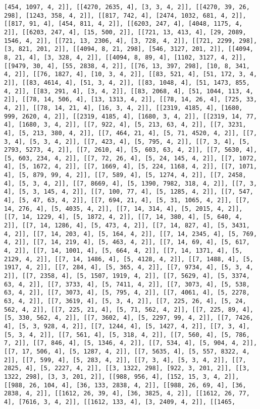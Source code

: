 \documentclass[12pt,fleqn]{article}\usepackage{../../common}
\begin{document}
\begin{verbatim}
[454, 1097, 4, 2]], [[4270, 2635, 4], [3, 3, 4, 2]], [[4270, 39, 26, 298], [1243, 358, 4, 2]], [[817, 742, 4], [2474, 1032, 681, 4, 2]], [[817, 91, 4], [454, 811, 4, 2]], [[6203, 247, 4], [4048, 1175, 4, 2]], [[6203, 247, 4], [15, 500, 2]], [[721, 13, 413, 4], [29, 2089, 1546, 4, 2]], [[721, 13, 2306, 4], [3, 728, 4, 2]], [[721, 2299, 298], [3, 821, 201, 2]], [[4094, 8, 21, 298], [546, 3127, 201, 2]], [[4094, 8, 21, 4], [3, 328, 4, 2]], [[4094, 8, 89, 4], [1102, 3127, 4, 2]], [[9479, 30, 4], [55, 2838, 4, 2]], [[76, 13, 397, 298], [10, 8, 341, 4, 2]], [[76, 1827, 4], [10, 3, 4, 2]], [[83, 521, 4], [51, 172, 3, 4, 2]], [[83, 4614, 4], [51, 3, 4, 2]], [[83, 1048, 4], [51, 1473, 855, 4, 2]], [[83, 291, 4], [3, 4, 2]], [[83, 2068, 4], [51, 1044, 113, 4, 2]], [[78, 14, 506, 4], [13, 1313, 4, 2]], [[78, 14, 26, 4], [725, 33, 4, 2]], [[78, 14, 21, 4], [16, 3, 4, 2]], [[2319, 4185, 4], [1680, 999, 2620, 4, 2]], [[2319, 4185, 4], [1680, 3, 4, 2]], [[2319, 14, 77, 4], [1680, 3, 4, 2]], [[7, 922, 4], [5, 213, 63, 4, 2]], [[7, 3231, 4], [5, 213, 380, 4, 2]], [[7, 464, 21, 4], [5, 71, 4520, 4, 2]], [[7, 3, 4], [5, 3, 4, 2]], [[7, 423, 4], [5, 795, 4, 2]], [[7, 3, 4], [5, 2793, 5273, 4, 2]], [[7, 2610, 4], [5, 603, 63, 4, 2]], [[7, 5630, 4], [5, 603, 234, 4, 2]], [[7, 72, 26, 4], [5, 24, 145, 4, 2]], [[7, 1072, 4], [5, 1672, 4, 2]], [[7, 1669, 4], [5, 224, 1168, 4, 2]], [[7, 1071, 4], [5, 879, 99, 4, 2]], [[7, 589, 4], [5, 1274, 4, 2]], [[7, 2458, 4], [5, 3, 4, 2]], [[7, 8669, 4], [5, 1390, 7982, 318, 4, 2]], [[7, 3, 4], [5, 3, 145, 4, 2]], [[7, 100, 77, 4], [5, 1285, 4, 2]], [[7, 547, 4], [5, 47, 63, 4, 2]], [[7, 694, 21, 4], [5, 31, 1065, 4, 2]], [[7, 14, 276, 4], [5, 4035, 4, 2]], [[7, 14, 314, 4], [5, 2015, 4, 2]], [[7, 14, 1229, 4], [5, 1872, 4, 2]], [[7, 14, 380, 4], [5, 640, 4, 2]], [[7, 14, 1286, 4], [5, 473, 4, 2]], [[7, 14, 827, 4], [5, 3431, 4, 2]], [[7, 14, 203, 4], [5, 164, 4, 2]], [[7, 14, 2345, 4], [5, 769, 4, 2]], [[7, 14, 219, 4], [5, 463, 4, 2]], [[7, 14, 69, 4], [5, 617, 4, 2]], [[7, 14, 1001, 4], [5, 664, 4, 2]], [[7, 14, 1371, 4], [5, 2129, 4, 2]], [[7, 14, 1486, 4], [5, 4128, 4, 2]], [[7, 1488, 4], [5, 1917, 4, 2]], [[7, 284, 4], [5, 365, 4, 2]], [[7, 9734, 4], [5, 3, 4, 2]], [[7, 2358, 4], [5, 1507, 1919, 4, 2]], [[7, 5629, 4], [5, 3374, 63, 4, 2]], [[7, 3733, 4], [5, 7411, 4, 2]], [[7, 3073, 4], [5, 538, 63, 4, 2]], [[7, 3073, 4], [5, 795, 4, 2]], [[7, 4061, 4], [5, 2278, 63, 4, 2]], [[7, 3619, 4], [5, 3, 4, 2]], [[7, 225, 26, 4], [5, 24, 562, 4, 2]], [[7, 225, 21, 4], [5, 71, 562, 4, 2]], [[7, 225, 89, 4], [5, 330, 562, 4, 2]], [[7, 3602, 4], [5, 2297, 99, 4, 2]], [[7, 7426, 4], [5, 3, 928, 4, 2]], [[7, 1244, 4], [5, 1427, 4, 2]], [[7, 3, 4], [5, 3, 4, 2]], [[7, 561, 4], [5, 318, 4, 2]], [[7, 560, 4], [5, 786, 7, 2]], [[7, 846, 4], [5, 1346, 4, 2]], [[7, 534, 4], [5, 904, 4, 2]], [[7, 17, 506, 4], [5, 1287, 4, 2]], [[7, 5635, 4], [5, 557, 8322, 4, 2]], [[7, 599, 4], [5, 283, 4, 2]], [[7, 3, 4], [5, 3, 4, 2]], [[7, 2825, 4], [5, 2227, 4, 2]], [[3, 1322, 298], [922, 3, 201, 2]], [[3, 1322, 298], [3, 3, 201, 2]], [[988, 956, 4], [152, 15, 3, 4, 2]], [[988, 26, 104, 4], [36, 133, 2838, 4, 2]], [[988, 26, 69, 4], [36, 2838, 4, 2]], [[1612, 26, 39, 4], [36, 3825, 4, 2]], [[1612, 26, 77, 4], [7616, 3, 4, 2]], [[1612, 133, 4], [3, 2409, 4, 2]], [[1465, 
\end{verbatim}
\end{document}
